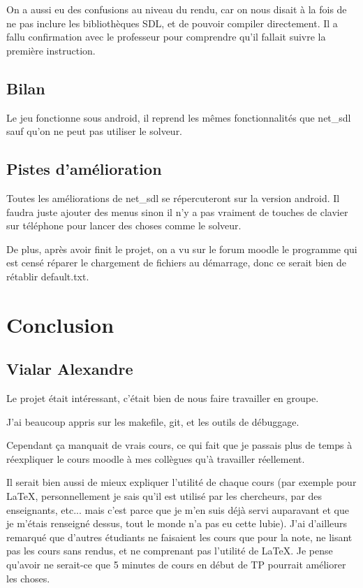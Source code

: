 \documentclass[12pt]{article}
\begin{document}
On a aussi eu des confusions au niveau du rendu, car on nous disait à la fois de ne pas inclure les bibliothèques SDL, et de pouvoir compiler directement. Il a fallu confirmation avec le professeur pour comprendre qu'il fallait suivre la première instruction.
\subsection{Bilan}
Le jeu fonctionne sous android, il reprend les mêmes fonctionnalités que net\_sdl sauf qu'on ne peut pas utiliser le solveur.
\subsection{Pistes d'amélioration}
Toutes les améliorations de net\_sdl se répercuteront sur la version android. Il faudra juste ajouter des menus sinon il n'y a pas vraiment de touches de clavier sur téléphone pour lancer des choses comme le solveur.

De plus, après avoir finit le projet, on a vu sur le forum moodle le programme qui est censé réparer le chargement de fichiers au démarrage, donc ce serait bien de rétablir default.txt.



\section{Conclusion}
\subsection{Vialar Alexandre}
Le projet était intéressant, c'était bien de nous faire travailler en groupe.

J'ai beaucoup appris sur les makefile, git, et les outils de débuggage.

Cependant ça manquait de vrais cours, ce qui fait que je passais plus de temps à réexpliquer le cours moodle à mes collègues qu'à travailler réellement.

Il serait bien aussi de mieux expliquer l'utilité de chaque cours (par exemple pour \LaTeX, personnellement je sais qu'il est utilisé par les chercheurs, par des enseignants, etc... mais c'est parce que je m'en suis déjà servi auparavant et que je m'étais renseigné dessus, tout le monde n'a pas eu cette lubie). 
J'ai d'ailleurs remarqué que d'autres étudiants ne faisaient les cours que pour la note, ne lisant pas les cours sans rendus, et ne comprenant pas l'utilité de \LaTeX.
Je pense qu'avoir ne serait-ce que 5 minutes de cours en début de TP pourrait améliorer les choses.
\end{document}

